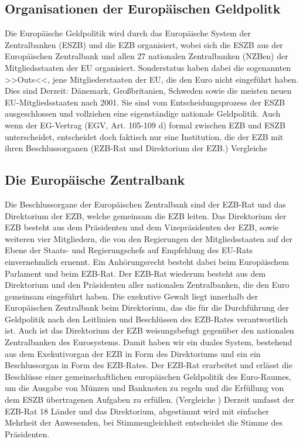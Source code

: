 \documentclass[
onecolumn,
a4paper,
abstracton,
parskip=half
,final
]{scrartcl}
\begin{document}
\clearpage

\subsection{Organisationen der Europ{\"a}ischen Geldpolitk}

Die Europ{\"a}ische Geldpolitik wird durch das Europ{\"a}ische System der Zentralbanken (ESZB) und die EZB organisiert, wobei sich die ESZB aus der Europ{\"a}ischen Zentralbank und allen 27 nationalen Zentralbanken (NZBen) der Mitgliedsstaaten der EU organisiert.
Sonderstatus haben dabei die sogenannten >>Outs<<, jene Mitgliederstaaten der EU, die den Euro  nicht eingef{\"u}hrt haben. Dies sind Derzeit: D{\"a}nemark, Großbritanien, Schweden sowie die meisten neuen EU-Mitgliedsstaaten nach 2001. Sie sind vom Entscheidungsprozess der ESZB ausgeschlossen und vollziehen eine eigenst{\"a}ndige nationale Geldpolitik.
Auch wenn der EG-Vertrag (EGV, Art. 105-109 d) formal zwischen EZB und ESZB unterscheidet, entscheidet doch faktisch nur eine Institution, die der EZB mit ihren Beschlussorganen (EZB-Rat und Direktorium der EZB.) Vergleiche  %

\subsection{Die Europ{\"a}ische Zentralbank}
Die Beschlussorgane der Europ{\"a}ischen Zentralbank sind der EZB-Rat und das Direktorium der EZB, welche gemeinsam die EZB leiten. Das Direktorium der EZB besteht aus dem Pr{\"a}sidenten und dem Vizepr{\"a}sidenten der EZB, sowie weiteren vier Mitgliedern, die von den Regierungen der Mitgliedsstaaten auf der Ebene der Staats- und Regierungschefs auf Empfehlung des EU-Rats einvernehmlich ernennt. Ein Anh{\"o}rungsrecht besteht dabei beim Europ{\"a}ischem Parlament und beim EZB-Rat.
Der EZB-Rat wiederum besteht aus dem Direktorium und den Pr{\"a}sidenten aller nationalen Zentralbanken, die den Euro gemeinsam eingef{\"u}hrt haben.
Die exekutive Gewalt liegt innerhalb der Europ{\"a}ischen Zentralbank beim Direktorium, das die f{\"u}r die Durchf{\"u}hrung der Geldpolitik nach den Leitlinien und Beschl{\"u}ssen des EZB-Rates verantwortlich ist. Auch ist das Direktorium der EZB weisungsbefugt gegen{\"u}ber den nationalen Zentralbanken des Eurosystems.  Damit haben wir ein duales System, bestehend aus dem Exekutivorgan der EZB in Form des Direktoriums und ein ein Beschlussorgan in Form des EZB-Rates.
Der EZB-Rat erarbeitet und erl{\"a}sst die Beschl{\"u}sse einer gemeinschaftlichen europ{\"a}ischen Geldpolitik des Euro-Raumes, um die Ausgabe von M{\"u}nzen und Banknoten zu regeln und die Erf{\"u}llung von dem ESZB {\"u}bertragenen Aufgaben zu erf{\"u}llen.  (Vergleiche  \citep{Basseler2010}  ) Derzeit umfasst der EZB-Rat 18 L{\"a}nder und das Direktorium, abgestimmt wird mit einfacher Mehrheit der Anwesenden, bei Stimmengleichheit entscheidet die Stimme des Pr{\"a}sidenten.
\end{document}
